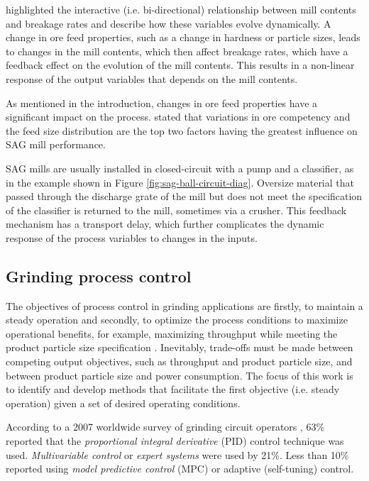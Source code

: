 \cite{powell_applying_2009} highlighted the interactive (i.e. bi-directional) relationship between mill contents and breakage rates and describe how these variables evolve dynamically. A change in ore feed properties, such as a change in hardness or particle sizes, leads to changes in the mill contents, which then affect breakage rates, which have a feedback effect on the evolution of the mill contents. This results in a non-linear response of the output variables that depends on the mill contents.

As mentioned in the introduction, changes in ore feed properties have a significant impact on the process. \cite{morrell_influence_2001} stated that variations in ore competency and the feed size distribution are the top two factors having the greatest influence on \gls{SAG} mill performance.

\gls{SAG} mills are usually installed in closed-circuit with a pump and a classifier, as in the example shown in Figure \ref{fig:sag-ball-circuit-diag}. Oversize material that passed through the discharge grate of the mill but does not meet the specification of the classifier is returned to the mill, sometimes via a crusher. This feedback mechanism has a transport delay, which further complicates the dynamic response of the process variables to changes in the inputs.

\subsection{Grinding process control}

The objectives of process control in grinding applications are firstly, to maintain a steady operation and secondly, to optimize the process conditions to maximize operational benefits, for example, maximizing throughput while meeting the product particle size specification \citep{wei_grinding_2009}. Inevitably, trade-offs must be made between competing output objectives, such as throughput and product particle size, and between product particle size and power consumption. The focus of this work is to identify and develop methods that facilitate the first objective (i.e. steady operation) given a set of desired operating conditions.

According to a 2007 worldwide survey of grinding circuit operators \citep{wei_grinding_2009}, 63\% reported that the \textit{proportional integral derivative} (\gls{PID}) control technique was used. \textit{Multivariable control} or \textit{expert systems} were used by 21\%. Less than 10\% reported using \textit{model predictive control} (\gls{MPC}) or adaptive (self-tuning) control.

